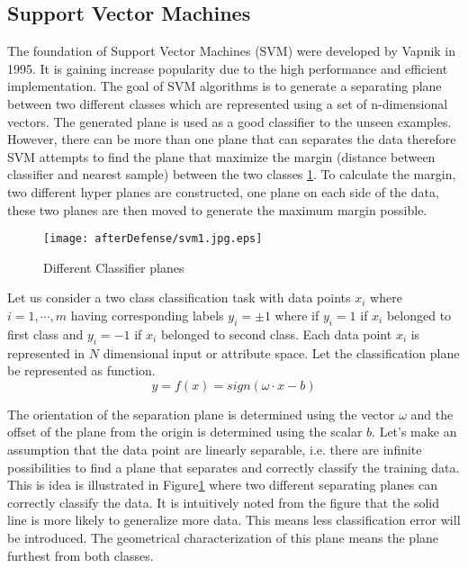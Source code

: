 \subsection{Support Vector Machines}
\label{Sec:SVMdetail}
The foundation of Support Vector Machines (SVM) were developed by Vapnik \cite{svmintroduce} in 1995. It is gaining increase popularity due to the high performance and efficient implementation. The goal of SVM algorithms is to generate a separating plane between two different classes which are represented using a set of n-dimensional vectors. The generated plane is used as a good classifier to the unseen examples. However, there can be more than one plane that can separates the data therefore SVM attempts to find the plane that maximize the margin (distance between classifier and nearest sample) between the two classes \ref{fig:svm1}. To calculate the margin, two different hyper planes are constructed, one plane on each side of the data, these two planes are then moved to generate the maximum margin possible.  
\begin{figure}
	\centering
		\texttt{[image: afterDefense/svm1.jpg.eps]}
	\caption{Different Classifier planes }
	\label{fig:svm1}
\end{figure}


Let us consider a two class classification task with data points $x_i$ where $i=1,\cdots,m$ having corresponding labels $y_i=\pm1$ where if  $y_i=1$ if $x_i$ belonged to first class and $y_i=-1$ if $x_i$ belonged to second class. Each data point $x_i$ is represented in $N$ dimensional input or attribute space. Let the classification plane be represented as function. 
\begin{equation}
 y=f(x)=sign(\omega \cdot x - b)
\label{eq:planeEq}
\end{equation}

 The orientation of the separation plane is determined using the vector $\omega$ and the offset of the plane from the origin is determined using the scalar $b$.   Let's make an assumption that the data point are linearly separable, i.e. there are infinite possibilities to find a plane that separates and correctly classify the training data. This is idea is illustrated in Figure\ref{fig:svm1} where two different separating planes can correctly classify the data. It is intuitively noted from the figure that the solid line is more likely to generalize more data. This means less classification error will be introduced. The geometrical characterization of this plane means the plane furthest from both classes.     %
 
